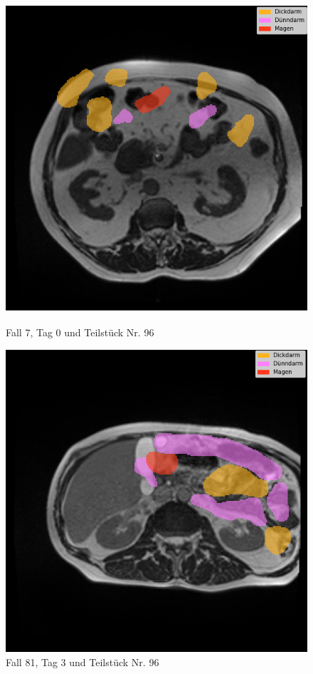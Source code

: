 \begin{figure}[H]
    \begin{minipage}{0.45\textwidth}
    \centering
\includegraphics[width=.8\textwidth]{bilder/case7-day0-slice-0096}
    \caption{Fall 7, Tag 0 und Teilstück Nr. 96}
    \end{minipage}\hfill
    \begin{minipage}{0.45\textwidth}
\includegraphics[width=.8\textwidth]{bilder/case81-day30-slice-0096}
    \caption{Fall 81, Tag 3 und Teilstück Nr. 96}
    \label{fig:false-seg}
    \end{minipage}
    \centering
\end{figure}

